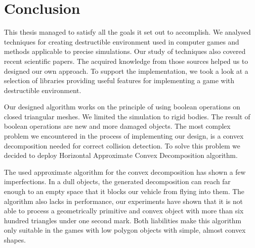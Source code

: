 \chapter*{Conclusion}

This thesis managed to satisfy all the goals it set out to accomplish. We analysed techniques for creating destructible environment used in computer games and methods applicable to precise simulations. Our study of techniques also covered recent scientific papers. The acquired knowledge from those sources helped us to designed our own approach. To support the implementation, we took a look at a selection of libraries providing useful features for  implementing a game with destructible environment.

Our designed algorithm works on the principle of using boolean operations on closed triangular meshes. We limited the simulation to rigid bodies. The result of boolean operations are new and more damaged objects. The most complex problem we encountered in the process of implementing our design, is a convex decomposition needed for correct collision detection. To solve this problem we decided to deploy Horizontal Approximate Convex Decomposition algorithm.

The used approximate algorithm for the convex decomposition has shown a few imperfections. In a dull objects, the generated decomposition can reach far enough to an empty space that it blocks our vehicle from flying into them. The algorithm also lacks in performance, our experiments have shown that it is not able to process a geometrically primitive and convex object with more than six hundred triangles under one second mark. Both liabilities make this algorithm only suitable in the games with low polygon objects with simple, almost convex shapes.

